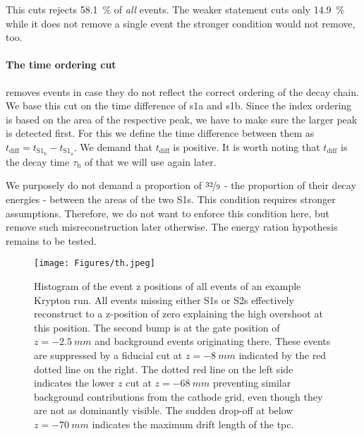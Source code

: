 This cuts rejects \SI{58.1}{\%} of \emph{all} events. %
The weaker statement cuts only \SI{14.9}{\%} while it does not remove a single event the stronger condition would not remove, too.


\paragraph{The time ordering cut} removes events in case they do not reflect the correct ordering of the decay chain.
We base this cut on the time difference of \gls{s1a} and \gls{s1b}.
Since the index ordering is based on the area of the respective peak, we have to make sure the larger peak is detected first.
For this we define the time difference between them as $t_\mathrm{diff} = t_{\mathrm{S}1_\mathrm{b}} - t_{\mathrm{S}1_\mathrm{a}}$.
We demand that $t_\mathrm{diff}$ is positive.
It is worth noting that $t_\mathrm{diff}$ is the decay time $\tau_\mathrm{b}$ of  that we will use again later. %

We purposely do not demand a proportion of $ \nicefrac{32}{9} $ - the proportion of their decay energies - between the areas of the two S1s.
This condition requires stronger assumptions.
Therefore, we do not want to enforce this condition here, but remove such misreconstruction later otherwise.
The energy ration hypothesis remains to be tested.

\begin{figure}[H]
    \centering
    \texttt{[image: Figures/th.jpeg]}  %
    \caption[Fiducial z-cut]{Histogram of the event z positions of all events of an example Krypton run.
    All events missing either S1s or S2s effectively reconstruct to a z-position of zero explaining the high overshoot at this position.
    The second bump is at the gate position of $ z = \SI{-2.5}{mm}$ and background events originating there.
    These events are suppressed by a fiducial cut at $ z = \SI{-8}{mm}$ indicated by the red dotted line on the right.
    The dotted red line on the left side indicates the lower $z$ cut at $ z = \SI{-68}{mm}$ preventing similar background contributions from the cathode grid,
    even though they are not as dominantly visible.
    The sudden drop-off at below $ z = \SI{-70}{mm}$ indicates the maximum drift length of the \gls{tpc}.
    }
    \label{fig:fid-z-cut}
\end{figure}

